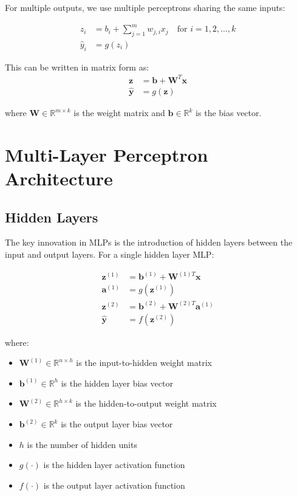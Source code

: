 \documentclass{article}
\begin{document}
For multiple outputs, we use multiple perceptrons sharing the same inputs:

\begin{align}
z_i &= b_i + \sum_{j=1}^{m} w_{j,i} x_j \quad \text{for } i = 1, 2, \ldots, k \\
\hat{y}_i &= g(z_i)
\end{align}

This can be written in matrix form as:
\begin{align}
\boldsymbol{z} &= \boldsymbol{b} + \boldsymbol{W}^T\boldsymbol{x} \\
\hat{\boldsymbol{y}} &= g(\boldsymbol{z})
\end{align}

where $\boldsymbol{W} \in \mathbb{R}^{m \times k}$ is the weight matrix and $\boldsymbol{b} \in \mathbb{R}^{k}$ is the bias vector.

\section{Multi-Layer Perceptron Architecture}

\subsection{Hidden Layers}

The key innovation in MLPs is the introduction of hidden layers between the input and output layers. For a single hidden layer MLP:

\begin{align}
\boldsymbol{z}^{(1)} &= \boldsymbol{b}^{(1)} + \boldsymbol{W}^{(1)T}\boldsymbol{x} \label{eq:hidden_linear}\\
\boldsymbol{a}^{(1)} &= g(\boldsymbol{z}^{(1)}) \label{eq:hidden_activation}\\
\boldsymbol{z}^{(2)} &= \boldsymbol{b}^{(2)} + \boldsymbol{W}^{(2)T}\boldsymbol{a}^{(1)} \label{eq:output_linear}\\
\hat{\boldsymbol{y}} &= f(\boldsymbol{z}^{(2)}) \label{eq:output_activation}
\end{align}

where:
\begin{itemize}
    \item $\boldsymbol{W}^{(1)} \in \mathbb{R}^{n \times h}$ is the input-to-hidden weight matrix
    \item $\boldsymbol{b}^{(1)} \in \mathbb{R}^{h}$ is the hidden layer bias vector
    \item $\boldsymbol{W}^{(2)} \in \mathbb{R}^{h \times k}$ is the hidden-to-output weight matrix
    \item $\boldsymbol{b}^{(2)} \in \mathbb{R}^{k}$ is the output layer bias vector
    \item $h$ is the number of hidden units
    \item $g(\cdot)$ is the hidden layer activation function
    \item $f(\cdot)$ is the output layer activation function
\end{itemize}
\end{document}
